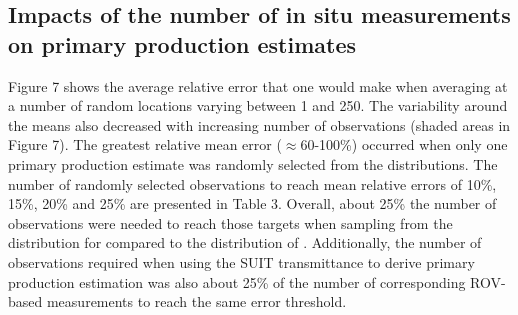 \subsection{Impacts of the number of in situ \DIFdelbegin {}\DIFdelend \DIFaddbegin {}\DIFaddend measurements on primary production estimates}

Figure 7 shows the average relative error that one would make when averaging \DIFdelbegin {}\DIFdelend \DIFaddbegin {}\DIFaddend at a number of random locations varying between 1 and 250. \DIFdelbegin {}\DIFdelend The variability around the means also decreased with increasing number of observations (shaded areas in Figure 7). The greatest relative mean error ($\approx$60-100\%) occurred when only one primary production estimate was randomly selected from the distributions. The number of randomly selected observations to reach mean relative errors of 10\%, 15\%, 20\% and 25\% are presented in Table 3. Overall, about 25\% the number of observations were needed to reach those targets when sampling from the distribution for \ppmixing{} compared to the distribution of \ppunderice{}. Additionally, the number of observations required when using the SUIT transmittance to derive primary production estimation was also about 25\% of the number of corresponding ROV-based measurements to reach the same error threshold.